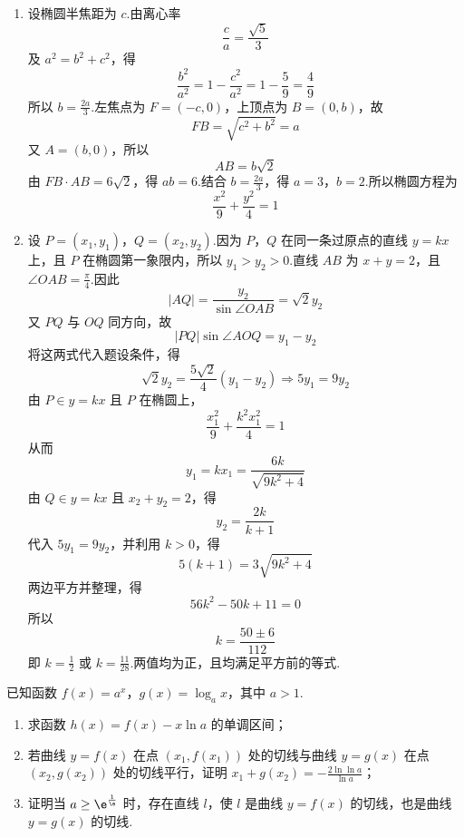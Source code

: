 \begin{solution}
\begin{enumerate}
\item 设椭圆半焦距为 \(c\).由离心率
\[
\frac ca=\frac{\sqrt5}{3}
\]
及 \(a^2=b^2+c^2\)，得
\[
\frac{b^2}{a^2}=1-\frac{c^2}{a^2}=1-\frac59=\frac49
\]
所以 \(b=\frac{2a}{3}\).左焦点为 \(F=(-c,0)\)，上顶点为 \(B=(0,b)\)，故
\[
FB=\sqrt{c^2+b^2}=a
\]
又 \(A=(b,0)\)，所以
\[
AB=b\sqrt2
\]
由 \(FB\cdot AB=6\sqrt2\)，得 \(ab=6\).结合 \(b=\frac{2a}{3}\)，得 \(a=3\)，\(b=2\).所以椭圆方程为
\[
\frac{x^2}{9}+\frac{y^2}{4}=1
\]

\item 设 \(P=(x_1,y_1)\)，\(Q=(x_2,y_2)\).因为 \(P\)，\(Q\) 在同一条过原点的直线 \(y=kx\) 上，且 \(P\) 在椭圆第一象限内，所以 \(y_1>y_2>0\).直线 \(AB\) 为 \(x+y=2\)，且 \(\angle OAB=\frac\pi4\).因此
\[
|AQ|=\frac{y_2}{\sin\angle OAB}=\sqrt2y_2
\]
又 \(PQ\) 与 \(OQ\) 同方向，故
\[
|PQ|\sin\angle AOQ=y_1-y_2
\]
将这两式代入题设条件，得
\[
\sqrt2y_2=\frac{5\sqrt2}{4}(y_1-y_2)
\Longrightarrow 5y_1=9y_2
\]
由 \(P\in y=kx\) 且 \(P\) 在椭圆上，
\[
\frac{x_1^2}{9}+\frac{k^2x_1^2}{4}=1
\]
从而
\[
y_1=kx_1=\frac{6k}{\sqrt{9k^2+4}}
\]
由 \(Q\in y=kx\) 且 \(x_2+y_2=2\)，得
\[
y_2=\frac{2k}{k+1}
\]
代入 \(5y_1=9y_2\)，并利用 \(k>0\)，得
\[
5(k+1)=3\sqrt{9k^2+4}
\]
两边平方并整理，得
\[
56k^2-50k+11=0
\]
所以
\[
k=\frac{50\pm6}{112}
\]
即 \(k=\frac12\) 或 \(k=\frac{11}{28}\).两值均为正，且均满足平方前的等式.
\end{enumerate}
\end{solution}

\begin{problem}

已知函数 \(f(x)=a^x\)，\(g(x)=\log_a x\)，其中 \(a>1\).

\begin{enumerate}
\item 求函数 \(h(x)=f(x)-x\ln a\) 的单调区间；
\item 若曲线 \(y=f(x)\) 在点 \((x_1,f(x_1))\) 处的切线与曲线 \(y=g(x)\) 在点 \((x_2,g(x_2))\) 处的切线平行，证明 \(x_1+g(x_2)=-\frac{2\ln\ln a}{\ln a}\)；
\item 证明当 \(a\ge \e^{\frac1\e}\) 时，存在直线 \(l\)，使 \(l\) 是曲线 \(y=f(x)\) 的切线，也是曲线 \(y=g(x)\) 的切线.
\end{enumerate}
\end{problem}

